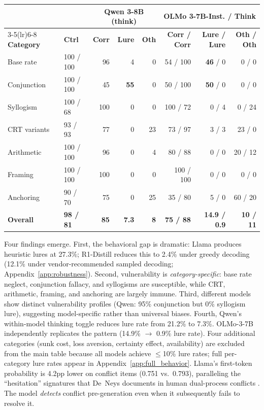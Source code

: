 \documentclass{article}
\begin{document}
\begin{table}[t]
\vspace{6pt}
\scriptsize
\setlength{\tabcolsep}{2.5pt}
\begin{tabular}{ll rrr rrr}
\toprule
& & \multicolumn{3}{c}{\textbf{Qwen 3-8B (think)}} & \multicolumn{3}{c}{\textbf{OLMo 3-7B-Inst. / Think}} \\
\cmidrule(lr){3-5}\cmidrule(lr){6-8}
\textbf{Category} & \textbf{Ctrl} & \textbf{Corr} & \textbf{Lure} & \textbf{Oth} & \textbf{Corr / Corr} & \textbf{Lure / Lure} & \textbf{Oth / Oth} \\
\midrule
Base rate      & 100 / 100 & 96  & 4   & 0   & 54 / 100 & \textbf{46} / 0 & 0 / 0 \\
Conjunction    & 100 / 100 & 45  & \textbf{55} & 0   & 50 / 100 & \textbf{50} / 0 & 0 / 0 \\
Syllogism      & 100 / 68  & 100 & 0   & 0   & 100 / 72 & 0 / 4  & 0 / 24 \\
\addlinespace
CRT variants   & 93 / 93   & 77  & 0   & 23  & 73 / 97  & 3 / 3  & 23 / 0 \\
Arithmetic     & 100 / 100 & 96  & 0   & 4   & 80 / 88  & 0 / 0  & 20 / 12 \\
Framing        & 100 / 100 & 100 & 0   & 0   & 100 / 100 & 0 / 0 & 0 / 0 \\
Anchoring      & 90 / 70   & 75  & 0   & 25  & 35 / 80  & 5 / 0  & 60 / 20 \\
\midrule
\textbf{Overall} & \textbf{98 / 81}
  & \textbf{85} & \textbf{7.3} & \textbf{8}
  & \textbf{75 / 88} & \textbf{14.9 / 0.9} & \textbf{10 / 11} \\
\bottomrule
\end{tabular}
\end{table}

Four findings emerge.  First, the behavioral gap is dramatic: Llama produces heuristic lures at 27.3\%; R1-Distill reduces this to 2.4\% under greedy decoding (12.1\% under vendor-recommended sampled decoding; Appendix~\ref{app:robustness}).  Second, vulnerability is \emph{category-specific}: base rate neglect, conjunction fallacy, and syllogisms are susceptible, while CRT, arithmetic, framing, and anchoring are largely immune.  Third, different models show distinct vulnerability profiles (Qwen: 95\% conjunction but 0\% syllogism lure), suggesting model-specific rather than universal biases.  Fourth, Qwen's within-model thinking toggle reduces lure rate from 21.2\% to 7.3\%.
OLMo-3-7B \citep{olmo3} independently replicates the pattern (14.9\% $\to$ 0.9\% lure rate).  Four additional categories (sunk cost, loss aversion, certainty effect, availability) are excluded from the main table because all models achieve $\leq$10\% lure rates; full per-category lure rates appear in Appendix~\ref{app:full_behavior}.  Llama's first-token probability is 4.2pp lower on conflict items (0.751 vs.\ 0.793), paralleling the ``hesitation'' signatures that De~Neys documents in human dual-process conflicts \citep{deneys2012bias, botvinick2001conflict}.  The model \emph{detects} conflict pre-generation even when it subsequently fails to resolve it.
\end{document}

